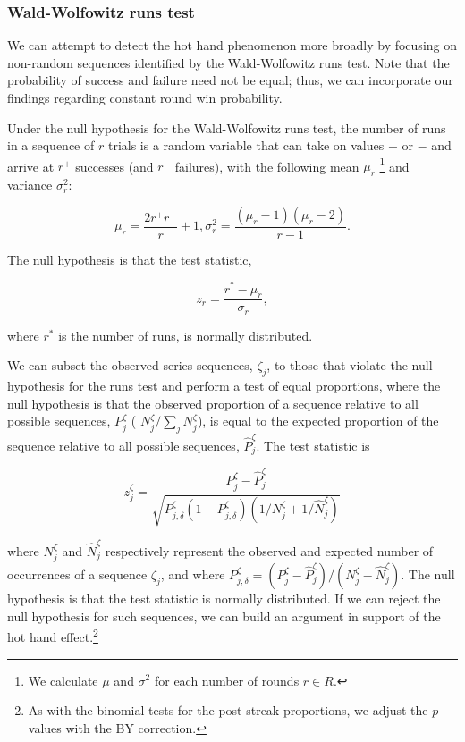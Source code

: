 \documentclass{article}
\begin{document}
\hypertarget{wald-wolfowitz-runs-test}{%
\subsubsection{Wald-Wolfowitz runs
test}\label{wald-wolfowitz-runs-test}}

We can attempt to detect the hot hand phenomenon more broadly by
focusing on non-random sequences identified by the Wald-Wolfowitz runs
test. Note that the probability of success and failure need not be
equal; thus, we can incorporate our findings regarding constant round
win probability.

Under the null hypothesis for the Wald-Wolfowitz runs test, the number
of runs in a sequence of \(r\) trials is a random variable that can take
on values \(+\) or \(-\) and arrive at \(r^+\) successes (and \(r^-\)
failures), with the following mean \(\mu_r\) \footnote{We calculate
  \(\mu\) and \(\sigma^2\) for each number of rounds \(r \in R\).} and
variance \(\sigma_r^2\):

\begin{equation}\label{eq:ww}
\mu_r = \frac{2r^{+}r^{-}}{r} + 1, \sigma_r^2 = \frac{(\mu_r-1)(\mu_r-2)}{r-1}.
\end{equation}

The null hypothesis is that the test statistic,

\begin{equation}\label{eq:wwz}
z_r = \frac{r^* - \mu_r}{\sigma_r},
\end{equation}

where \(r^*\) is the number of runs, is normally distributed.

We can subset the observed series sequences, \(\zeta_j\), to those that
violate the null hypothesis for the runs test and perform a test of
equal proportions, where the null hypothesis is that the observed
proportion of a sequence relative to all possible sequences,
\(P^{\zeta}_j\) ( \(N^\zeta_j / \sum_j N^\zeta_j\)), is equal to the
expected proportion of the sequence relative to all possible sequences,
\(\hat{P}^\zeta_j\). The test statistic is

\begin{equation}\label{eq:prop}
z^\zeta_j = \frac{P^\zeta_j - \hat{P}^\zeta_j}{\sqrt{P^\zeta_{j,\delta} (1 - P^\zeta_{j,\delta}) (1 / N^\zeta_j + 1 / \hat{N}^\zeta_j)  } }
\end{equation}

where \(N^\zeta_j\) and \(\hat{N}^\zeta_j\) respectively represent the
observed and expected number of occurrences of a sequence \(\zeta_j\),
and where
\(P^\zeta_{j,\delta} = (P^\zeta_j - \hat{P}^\zeta_j) / ({N^\zeta_j - \hat{N}^\zeta_j})\).
The null hypothesis is that the test statistic is normally distributed.
If we can reject the null hypothesis for such sequences, we can build an
argument in support of the hot hand effect.\footnote{As with the
  binomial tests for the post-streak proportions, we adjust the
  \(p\)-values with the BY correction.}
\end{document}
